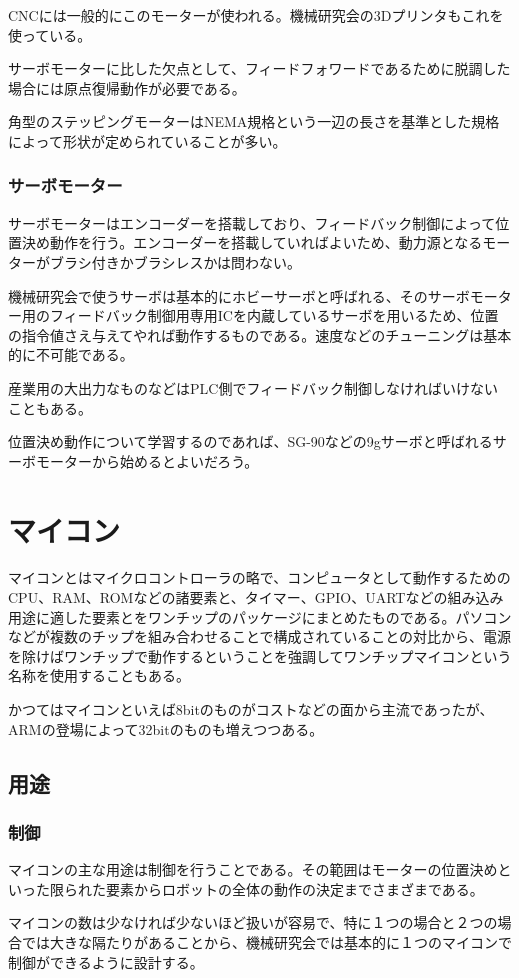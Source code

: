 \documentclass[a4paper,titlepage]{ujarticle}
\begin{document}
CNCには一般的にこのモーターが使われる。機械研究会の3Dプリンタもこれを使っている。

サーボモーターに比した欠点として、フィードフォワードであるために脱調した場合には原点復帰動作が必要である。

角型のステッピングモーターはNEMA規格という一辺の長さを基準とした規格によって形状が定められていることが多い。
\subsubsection{サーボモーター}
サーボモーターはエンコーダーを搭載しており、フィードバック制御によって位置決め動作を行う。エンコーダーを搭載していればよいため、動力源となるモーターがブラシ付きかブラシレスかは問わない。

機械研究会で使うサーボは基本的にホビーサーボと呼ばれる、そのサーボモーター用のフィードバック制御用専用ICを内蔵しているサーボを用いるため、位置の指令値さえ与えてやれば動作するものである。速度などのチューニングは基本的に不可能である。

産業用の大出力なものなどはPLC側でフィードバック制御しなければいけないこともある。

位置決め動作について学習するのであれば、SG-90などの9gサーボと呼ばれるサーボモーターから始めるとよいだろう。
\section{マイコン}
マイコンとはマイクロコントローラの略で、コンピュータとして動作するためのCPU、RAM、ROMなどの諸要素と、タイマー、GPIO、UARTなどの組み込み用途に適した要素とをワンチップのパッケージにまとめたものである。パソコンなどが複数のチップを組み合わせることで構成されていることの対比から、電源を除けばワンチップで動作するということを強調してワンチップマイコンという名称を使用することもある。

かつてはマイコンといえば8bitのものがコストなどの面から主流であったが、ARMの登場によって32bitのものも増えつつある。

\subsection{用途}
\subsubsection{制御}
マイコンの主な用途は制御を行うことである。その範囲はモーターの位置決めといった限られた要素からロボットの全体の動作の決定までさまざまである。

マイコンの数は少なければ少ないほど扱いが容易で、特に１つの場合と２つの場合では大きな隔たりがあることから、機械研究会では基本的に１つのマイコンで制御ができるように設計する。
\end{document}
